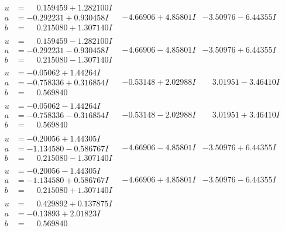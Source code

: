 \documentclass[1p]{elsarticle_modified}
\theoremstyle{definition}
\begin{document}
$$\begin{array}{c|c|c}
\begin{aligned}
u &= \phantom{-}0.159459 + 1.282100 I \\
a &= -0.292231 + 0.930458 I \\
b &= \phantom{-}0.215080 + 1.307140 I\end{aligned}
 & -4.66906 + 4.85801 I & -3.50976 - 6.44355 I \\ \hline\begin{aligned}
u &= \phantom{-}0.159459 - 1.282100 I \\
a &= -0.292231 - 0.930458 I \\
b &= \phantom{-}0.215080 - 1.307140 I\end{aligned}
 & -4.66906 - 4.85801 I & -3.50976 + 6.44355 I \\ \hline\begin{aligned}
u &= -0.05062 + 1.44264 I \\
a &= -0.758336 + 0.316854 I \\
b &= \phantom{-}0.569840\phantom{ +0.000000I}\end{aligned}
 & -0.53148 + 2.02988 I & \phantom{-}3.01951 - 3.46410 I \\ \hline\begin{aligned}
u &= -0.05062 - 1.44264 I \\
a &= -0.758336 - 0.316854 I \\
b &= \phantom{-}0.569840\phantom{ +0.000000I}\end{aligned}
 & -0.53148 - 2.02988 I & \phantom{-}3.01951 + 3.46410 I \\ \hline\begin{aligned}
u &= -0.20056 + 1.44305 I \\
a &= -1.134580 - 0.586767 I \\
b &= \phantom{-}0.215080 - 1.307140 I\end{aligned}
 & -4.66906 - 4.85801 I & -3.50976 + 6.44355 I \\ \hline\begin{aligned}
u &= -0.20056 - 1.44305 I \\
a &= -1.134580 + 0.586767 I \\
b &= \phantom{-}0.215080 + 1.307140 I\end{aligned}
 & -4.66906 + 4.85801 I & -3.50976 - 6.44355 I \\ \hline\begin{aligned}
u &= \phantom{-}0.429892 + 0.137875 I \\
a &= -0.13893 + 2.01823 I \\
b &= \phantom{-}0.569840\phantom{ +0.000000I}\end{aligned}

\end{array}$$
\end{document}
